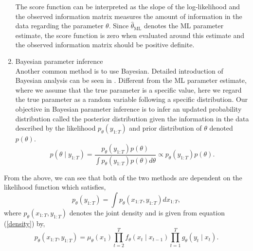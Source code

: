 \documentclass[mstat,12pt]{unswthesis}  %
\numberwithin{equation}{section}
\begin{document}
\begin{enumerate}
    The score function can be interpreted as the slope of the log-likelihood and the observed information matrix  
    measures the amount of information in the 
    data regarding the parameter $\theta$. Since  $\widehat{\theta}_{\mathrm{ML}}$ denotes the ML parameter estimate, the score function is zero when evaluated around this estimate and the  observed information matrix  should be positive definite.\\
    
    \item Bayesian parameter inference\\
    
    \noindent Another common method is to use Bayesian.
    Detailed introduction of Bayesian analysis can be seen in 
    \cite{berger2013statistical,robert2007bayesian}.
    Different from the  ML parameter estimate, where we assume that the true parameter
    is a specific value, here we regard the true parameter 
    as  a random variable following a specific distribution. 
    Our objective in Bayesian parameter inference is to
    infer an
    updated probability distribution called the posterior distribution given the information in the data 
    described by the likelihood $p_{\theta}\left(y_{1: T}\right)$ and prior  distribution of $\theta$ denoted $p\left(\theta\right)$.
    \begin{equation}p\left(\theta \mid y_{1: T}\right)=\frac{p_{\theta}\left(y_{1: T}\right) p(\theta)}{\int p_{\theta}\left(y_{1: T}\right) p(\theta) d \theta} \propto p_{\theta}\left(y_{1: T}\right) p(\theta).\end{equation}
\end{enumerate}

\noindent From the above, we can see that both of the two methods are dependent on the likelihood function which satisfies,
\begin{equation}p_{\theta}\left(y_{1: T}\right)=\int p_{\theta}\left(x_{1: T}, y_{1: T}\right) d x_{1: T},\end{equation}
where $p_{\theta}\left(x_{1: T}, y_{1: T}\right)$ denotes the joint density and is given from equation (\ref{density}) by,
\begin{equation}p_{\theta}\left(x_{1: T}, y_{1: T}\right)=\mu_{\theta}\left(x_{1}\right) \prod_{t=2}^{T} f_{\theta}\left(x_{t} \mid x_{t-1}\right) \prod_{t=1}^{T} g_{\theta}\left(y_{t} \mid x_{t}\right).\end{equation}
\end{document}
